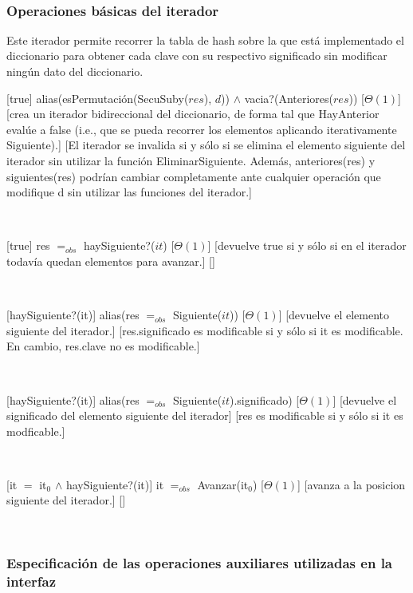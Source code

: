 ~

\subsubsection{Operaciones básicas del iterador}

Este iterador permite recorrer la tabla de hash sobre la que est\'{a} implementado el diccionario para obtener cada clave con su respectivo significado sin modificar ning\'{u}n dato del diccionario.

[true]
{alias(esPermutación(SecuSuby($res$), $d$)) $\land$ vacia?(Anteriores($res$))}
[$\Theta(1)$]
[crea un iterador bidireccional del diccionario, de forma tal que HayAnterior evalúe a false (i.e.,
que se pueda recorrer los elementos aplicando iterativamente Siguiente).]
[El iterador se invalida si y sólo si se elimina el elemento siguiente del iterador sin utilizar la función
EliminarSiguiente. Además, anteriores(res) y siguientes(res) podrían cambiar completamente ante cualquier
operación que modifique d sin utilizar las funciones del iterador.]

~

[true]
{res $=_{obs}$ haySiguiente?($it$)}
[$\Theta(1)$]
[devuelve true si y sólo si en el iterador todavía quedan elementos para avanzar.]
[]

~

[haySiguiente?(it)]
{alias(res $=_{obs}$ Siguiente($it$))}
[$\Theta(1)$]
[devuelve el elemento siguiente del iterador.]
[res.significado es modificable si y sólo si it es modificable. En cambio, res.clave no es modificable.]

~

[haySiguiente?(it)]
{alias(res $=_{obs}$ Siguiente($it$).significado)}
[$\Theta(1)$]
[devuelve el significado del elemento siguiente del iterador]
[res es modificable si y sólo si it es modficable.]

~

[it $=$ it$_0$ $\land$ haySiguiente?(it)]
{it $=_{obs}$ Avanzar(it$_0$)}
[$\Theta(1)$]
[avanza a la posicion siguiente del iterador.]
[]

~

\subsubsection{Especificación de las operaciones auxiliares utilizadas en la interfaz}

